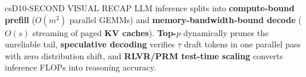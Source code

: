 \documentclass[../../../../master.tex]{subfiles}
\begin{document}
\begin{cscolumns}
\begin{cscard}{csD}{10-SECOND VISUAL RECAP}
  \sffamily\footnotesize
  LLM inference splits into \textbf{compute-bound prefill} ($O(m^2)$ parallel GEMMs) and \textbf{memory-bandwidth-bound decode} ($O(s)$ streaming of paged \textbf{KV caches}). \textbf{Top-$p$} dynamically prunes the unreliable tail, \textbf{speculative decoding} verifies $\tau$ draft tokens in one parallel pass with zero distribution shift, and \textbf{RLVR/PRM test-time scaling} converts inference FLOPs into reasoning accuracy.
\end{cscard}
\end{cscolumns}

\csend
\end{document}
